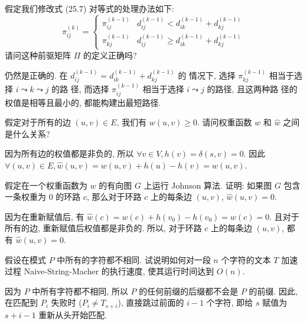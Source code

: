 \documentclass[boxes]{homework}
\begin{document}
\begin{problem}
假定我们修改式 (25.7) 对等式的处理办法如下:
\begin{equation}
    \pi_{ij}^{(k)} =
    \begin{cases}
        \pi_{ij}^{(k - 1)} & d_{ij}^{(k - 1)} < d_{ik}^{(k - 1)} +
        d_{kj}^{(k - 1)}                                                   \\
        \pi_{kj}^{(k - 1)} & d_{ij}^{(k - 1)} \geqslant d_{ik}^{(k - 1)} +
        d_{kj}^{(k - 1)}
    \end{cases}
\end{equation}
请问这种前驱矩阵 $\Pi$ 的定义正确吗?
\end{problem}
\begin{solution}
    仍然是正确的. 在 $d_{ij}^{(k - 1)} = d_{ik}^{(k - 1)} + d_{kj}^{(k - 1)}$ 的
    情况下, 选择 $\pi_{kj}^{(k - 1)}$ 相当于选择 $i \leadsto k \leadsto j$ 的路
    径, 而选择 $\pi_{ij}^{(k - 1)}$ 相当于选择 $i \leadsto j$ 的路径, 且这两种路
    径的权值是相等且最小的, 都能构建出最短路径.
\end{solution}

\begin{problem}
假定对于所有的边 $(u, v)\in E$, 我们有 $w(u, v) \geqslant 0$. 请问权重函数 $w$
和 $\hat{w}$ 之间是什么关系?
\end{problem}
\begin{solution}
    因为所有边的权值都是非负的, 所以 $\forall v \in V, h(v) = \delta(s,v) = 0$.
    因此 $\forall (u, v) \in E, \hat{w}(u, v) = w(u, v) + h(u) - h(v) = w(u, v)
    $.
\end{solution}

\begin{problem}
假定在一个权重函数为 $w$ 的有向图 $G$ 上运行 Johnson 算法. 证明: 如果图 $G$ 包含
一条权重为 0 的环路 $c$, 那么对于环路 $c$ 上的每条边 $(u, v)$, $\hat{w}(u,v)=0$.
\end{problem}
\begin{solution}
    因为在重新赋值后, 有 $\hat{w}(c) = w(c) + h(v_{0}) - h(v_{0}) = w(c) = 0$.
    且对于所有的边, 重新赋值后权值都是非负的. 所以, 对于环路 $c$ 上的每条边
    $(u, v)$, 都有 $\hat{w}(u, v) = 0$.
\end{solution}


\begin{problem}
假设在模式 $P$ 中所有的字符都不相同. 试说明如何对一段 $n$ 个字符的文本 $T$ 加速
过程 {\sc Naive-String-Macher} 的执行速度, 使其运行时间达到 $O(n)$.
\end{problem}
\begin{solution}
    因为 $P$ 中所有字符都不相同, 所以 $P$ 的任何前缀的后缀都不会是 $P$ 的前缀.
    因此, 在匹配到 $P_{i}$ 失败时 ($P_{i} \neq T_{s + i}$), 直接跳过前面的
    $i - 1$ 个字符, 即给 $s$ 赋值为 $s + i - 1$ 重新从头开始匹配.
\end{solution}
\end{document}
